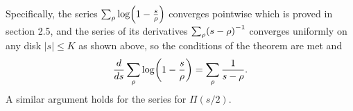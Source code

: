 \documentclass[12pt]{note}
\numberwithin{equation}{chapter}
\begin{document}
Specifically, the series $\sum_\rho\log\prn{1 - \frac{s}{\rho}}$ converges
pointwise which is proved in section 2.5, and the series of its derivatives
$\sum_\rho\prn{s - \rho}^{-1}$ converges uniformly on any disk $|s| \leq K$ as
shown above, so the conditions of the theorem are met and
\begin{equation*}
    \frac{d}{ds} \sum_\rho\log\prn{1 - \frac{s}{\rho}} = \sum_\rho\frac{1}{s -
        \rho}.
\end{equation*}
A similar argument holds for the series for $\Pi(s/2)$.




\end{document}

